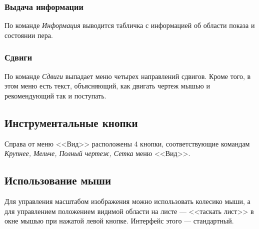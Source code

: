\documentclass[12pt,a4paper]{article}
\begin{document}
\subsubsection{Выдача информации}
По команде \emph{Информация} выводится табличка с информацией об области показа и состоянии пера.

\subsubsection{Сдвиги}

По команде \emph{Сдвиги} выпадает меню четырех направлений сдвигов. Кроме того, в этом меню есть текст,  объясняющий, как двигать чертеж мышью и рекомендующий так и поступать.

\subsection{Инструментальные кнопки}

Справа от меню <<Вид>> расположены 4 кнопки, соответствующие командам \emph{Крупнее, Мельче, Полный чертеж, Сетка} меню <<Вид>>.

\subsection{Использование мыши}
\label{drawmouse}

Для управления масштабом изображения можно использовать колесико мыши, а для управлением положением видимой области на листе --- <<таскать лист>> в окне мышью при нажатой левой кнопке. Интерфейс этого --- стандартный.
\end{document}
